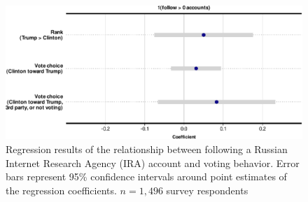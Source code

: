 \documentclass[
  12pt,
]{article}
\begin{document}
\begin{figure}
\centering
\includegraphics{Appendix_files/figure-latex/Figure-E7-1.pdf}
\caption{\label{fig:Figure-E7}Regression results of the relationship between following a Russian Internet Research Agency (IRA) account and voting behavior. Error bars represent 95\% confidence intervals around point estimates of the regression coefficients. \(n = 1,496\) survey respondents}
\end{figure}
\end{document}
